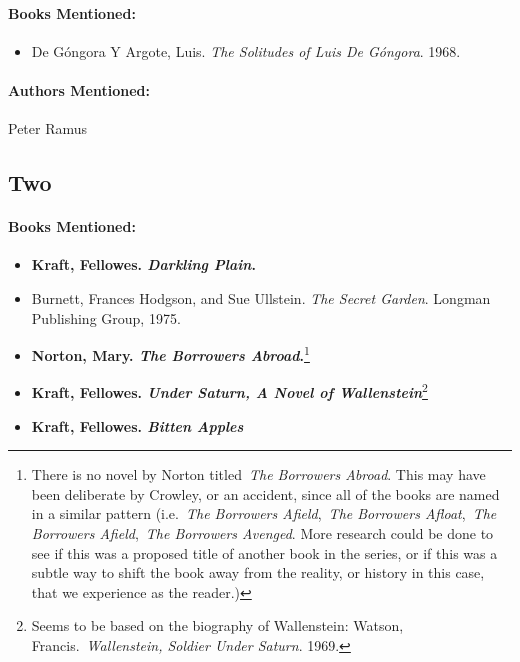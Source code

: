 \documentclass[12pt]{article}
\providecommand{\tightlist}{%
  \setlength{\itemsep}{0pt}\setlength{\parskip}{0pt}}
\begin{document}
\paragraph{Books Mentioned:}\label{books-mentioned-2}

\begin{itemize}
\tightlist
\item
  De Góngora Y Argote, Luis. \emph{The Solitudes of Luis De Góngora}. 1968.
\end{itemize}

\paragraph{Authors Mentioned:}\label{authors-mentioned-1}

Peter Ramus

\subsection{Two}\label{two}

\paragraph{Books Mentioned:}\label{books-mentioned-3}

\begin{itemize}
\tightlist
\item
  \textbf{Kraft, Fellowes. \emph{Darkling Plain}.}
\item
  Burnett, Frances Hodgson, and Sue Ullstein. \emph{The Secret Garden}. Longman Publishing Group, 1975.
\item
  \textbf{Norton, Mary. \emph{The Borrowers Abroad}.}\footnote{There is no novel by Norton titled~\emph{The Borrowers Abroad}. This may have been deliberate by Crowley, or an accident, since all of the books are named in a similar pattern (i.e.~\emph{The Borrowers Afield},~\emph{The Borrowers Afloat},~\emph{The Borrowers Afield},~\emph{The Borrowers Avenged}. More research could be done to see if this was a proposed title of another book in the series, or if this was a subtle way to shift the book away from the reality, or history in this case, that we experience as the reader.)}
\item
  \textbf{Kraft, Fellowes. \emph{Under Saturn, A Novel of Wallenstein}}\footnote{Seems to be based on the biography of Wallenstein: Watson, Francis.~\emph{Wallenstein, Soldier Under Saturn}. 1969.}
\item
  \textbf{Kraft, Fellowes. \emph{Bitten Apples}}
\end{itemize}
\end{document}

